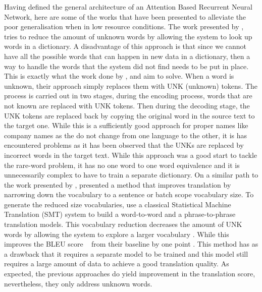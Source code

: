 Having defined the general architecture of an Attention Based Recurrent Neural Network, here are some of the works that have been presented to alleviate the poor generalisation when in low resource conditions. The work presented by \citet*{DBLP:journals/corr/JeanCMB14}, tries to reduce the amount of unknown words by allowing the system to look up words in a dictionary. A disadvantage of this approach is that since we cannot have all the possible words that can happen in new data in a dictionary, then a way to handle the words that the system did not find needs to be put in place. This is exactly what the work done by \citet*{DBLP:journals/corr/GulcehreANZB16}, \citet*{DBLP:journals/corr/LuongSLVZ14} and \citet*{DBLP:journals/corr/GuLLL16} aim to solve.
When a word is unknown, their approach simply replaces them with UNK (unknown) tokens. The process is carried out in two stages, during the encoding process, words that are not known are replaced with UNK tokens. Then during the decoding stage, the UNK tokens are replaced back by copying the original word in the source text to the target one. While this is a sufficiently good approach for proper names like company names as the do not change from one language to the other, it is has encountered problems as it has been observed that the UNKs are replaced by incorrect words in the target text. While this approach was a good start to tackle the rare-word problem, it has no one word to one word equivalence and it is unnecessarily complex to have to train a separate dictionary. On a similar path to the work presented by \citet{DBLP:journals/corr/JeanCMB14}, \citet*{DBLP:journals/corr/MiWI16} presented a method that improves translation by narrowing down the vocabulary to a sentence or batch scope vocabulary size. To generate the reduced size vocabularies, \citet{DBLP:journals/corr/MiWI16} use a classical Statistical Machine Translation (SMT) system to build a word-to-word and a phrase-to-phrase translation models. This vocabulary reduction decreases the amount of UNK words by allowing the system to explore a larger vocabulary \citep{DBLP:journals/corr/abs-1710-01329}. While this improves the BLEU score ~\citep{Papineni02bleu:a} from their baseline by one point \citep{DBLP:journals/corr/MiWI16}. This method has as a drawback that it requires a separate model to be trained and this model still requires a large amount of data to achieve a good translation quality. As expected, the previous approaches do yield improvement in the translation score, nevertheless, they only address unknown words.

